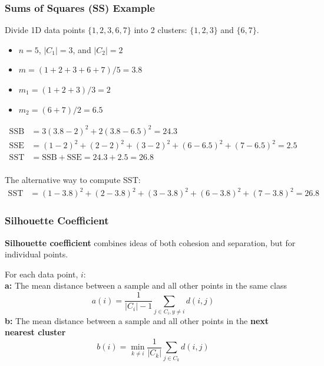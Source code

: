 \documentclass[aspectratio=169, 10pt]{beamer}
\begin{document}
\begin{frame}
    \frametitle{Sums of Squares (SS) Example}

    \begin{example}
        Divide 1D data points $\{1,2,3,6,7\}$ into 2 clusters: $\{1,2,3\}$ and $\{6,7\}$. 
    \end{example}
    
    \begin{itemize}
        \item $n = 5$, $|C_1|=3$, and $|C_2|=2$
        \item $m = (1 + 2 + 3 + 6 + 7)/5 = 3.8$
        \item $m_1 = (1 + 2 + 3)/3=2$
        \item $m_2 = (6+7)/2=6.5$
    \end{itemize}

    \begin{equation*}
        \begin{array} {rl}
            \text{SSB} & = 3(3.8-2)^2 + 2(3.8-6.5)^2 = 24.3 \\
            \text{SSE} & = (1-2)^2 + (2-2)^2 + (3-2)^2 + (6-6.5)^2 + (7-6.5)^2 = 2.5 \\
            \text{SST} & = \text{SSB} + \text{SSE} = 24.3 + 2.5 = 26.8 \\
        \end{array}
    \end{equation*}

    The alternative way to compute SST:
    \begin{equation*}
        \begin{array} {rl}
            \text{SST} & = (1-3.8)^2 + (2-3.8)^2 + (3-3.8)^2 + (6-3.8)^2 + (7-3.8)^2 = 26.8
        \end{array}
    \end{equation*}
    
\end{frame}

\begin{frame}
    \frametitle{Silhouette Coefficient}
    \small

    \textbf{Silhouette coefficient} combines ideas of both cohesion and separation, but for individual points.
    
    For each data point, $i$:\\
    \textbf{a:} The mean distance between a sample and all other points in the same class
    \begin{equation*}
        a(i) = \frac{1}{|C_i|-1} \sum_{j \in C_i, y \neq i}d(i, j)
    \end{equation*}
    \textbf{b:} The mean distance between a sample and all other points in the \textbf{next nearest cluster}
    \begin{equation*}
        b(i) = \min_{k \neq i} \frac{1}{|C_k|} \sum_{j \in C_k}d(i, j)
    \end{equation*}
    
\end{frame}
\end{document}
